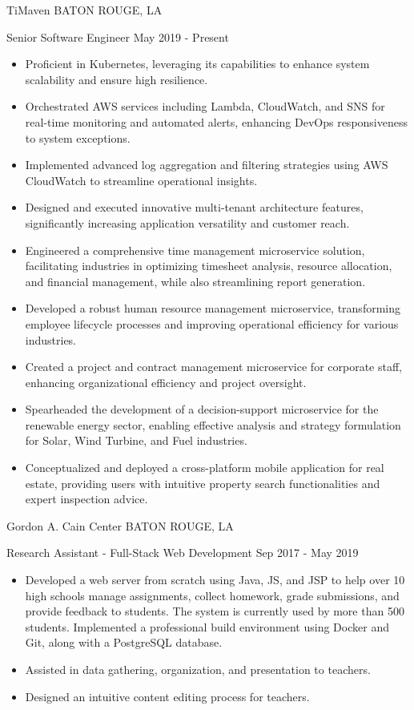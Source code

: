 \documentclass[10pt,a4paper]{article}
\begin{document}
\headedsection
{TiMaven}
{\textsc{BATON ROUGE, LA}}
{
  \headedsubsection
  {Senior Software Engineer}
  {May 2019 - Present}
  {
    \begin{itemize}
      \item Proficient in Kubernetes, leveraging its capabilities to enhance system scalability and ensure high resilience.
      \item Orchestrated AWS services including Lambda, CloudWatch, and SNS for real-time monitoring and automated alerts, enhancing DevOps responsiveness to system exceptions.
      \item Implemented advanced log aggregation and filtering strategies using AWS CloudWatch to streamline operational insights.
      \item Designed and executed innovative multi-tenant architecture features, significantly increasing application versatility and customer reach.
      \item Engineered a comprehensive time management microservice solution, facilitating industries in optimizing timesheet analysis, resource allocation, and financial management, while also streamlining report generation.
      \item Developed a robust human resource management microservice, transforming employee lifecycle processes and improving operational efficiency for various industries.
      \item Created a project and contract management microservice for corporate staff, enhancing organizational efficiency and project oversight.
      \item Spearheaded the development of a decision-support microservice for the renewable energy sector, enabling effective analysis and strategy formulation for Solar, Wind Turbine, and Fuel industries.
      \item Conceptualized and deployed a cross-platform mobile application for real estate, providing users with intuitive property search functionalities and expert inspection advice.
    \end{itemize}
  }
}

  \headedsection
{Gordon A. Cain Center}
{\textsc{BATON ROUGE, LA}}
{
  \headedsubsection
  {Research Assistant - Full-Stack Web Development}
  {Sep 2017 - May 2019}
  {
    \begin{itemize}
      \item Developed a web server from scratch using Java, JS, and JSP to help over 10 high schools manage assignments, collect homework, grade submissions, and provide feedback to students. The system is currently used by more than 500 students. Implemented a professional build environment using Docker and Git, along with a PostgreSQL database.
      \item Assisted in data gathering, organization, and presentation to teachers.
      \item Designed an intuitive content editing process for teachers.
    \end{itemize}
  }
}
\end{document}
